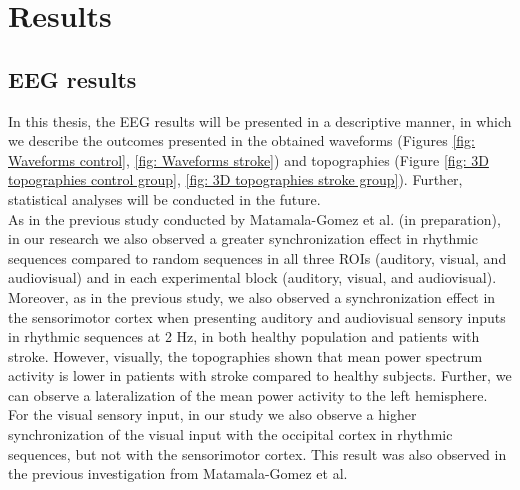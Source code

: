 \chapter{Results}
\section{EEG results}
In this thesis, the EEG results will be presented in a descriptive manner, in which we describe the outcomes presented in the obtained waveforms (Figures \ref{fig: Waveforms control}, \ref{fig: Waveforms stroke}) and topographies (Figure \ref{fig: 3D topographies control group}, \ref{fig: 3D topographies stroke group}). Further, statistical analyses will be conducted in the future.  \\
As in the previous study conducted by Matamala-Gomez et al. (in preparation), in our research we also observed a greater synchronization effect in rhythmic sequences compared to random sequences in all three ROIs (auditory, visual, and audiovisual) and in each experimental block (auditory, visual, and audiovisual). Moreover, as in the previous study, we also observed a synchronization effect in the sensorimotor cortex when presenting auditory and audiovisual sensory inputs in rhythmic sequences at 2 Hz, in both healthy population and patients with stroke. However, visually, the topographies shown that mean power spectrum activity is lower in patients with stroke compared to healthy subjects. Further, we can observe a lateralization of the mean power activity to the left hemisphere. For the visual sensory input, in our study we also observe a higher synchronization of the visual input with the occipital cortex in rhythmic sequences, but not with the sensorimotor cortex. This result was also observed in the previous investigation from Matamala-Gomez et al.
